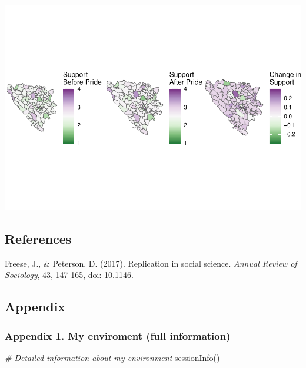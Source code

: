 \documentclass[
]{article}
\newenvironment{Shaded}{\begin{snugshade}}{\end{snugshade}}
\newcommand{\CommentTok}[1]{\textcolor[rgb]{0.56,0.35,0.01}{\textit{#1}}}
\newcommand{\FunctionTok}[1]{\textcolor[rgb]{0.00,0.00,0.00}{#1}}
\newcommand{\NormalTok}[1]{#1}
\begin{document}
\includegraphics{SMI205_Assessment2_Template_files/figure-latex/maps-1.pdf}

\hypertarget{references}{%
\subsection{References}\label{references}}

Freese, J., \& Peterson, D. (2017). Replication in social science.
\emph{Annual Review of Sociology}, 43, 147-165,
\href{https://www.annualreviews.org/doi/abs/10.1146/annurev-soc-060116-053450}{doi:
10.1146}.

\hypertarget{appendix}{%
\subsection{Appendix}\label{appendix}}

\hypertarget{appendix-1.-my-enviroment-full-information}{%
\subsubsection{Appendix 1. My enviroment (full
information)}\label{appendix-1.-my-enviroment-full-information}}

\begin{Shaded}
\begin{Highlighting}[]
\CommentTok{\# Detailed information about my environment}
\FunctionTok{sessionInfo}\NormalTok{()}
\end{Highlighting}
\end{Shaded}
\end{document}
